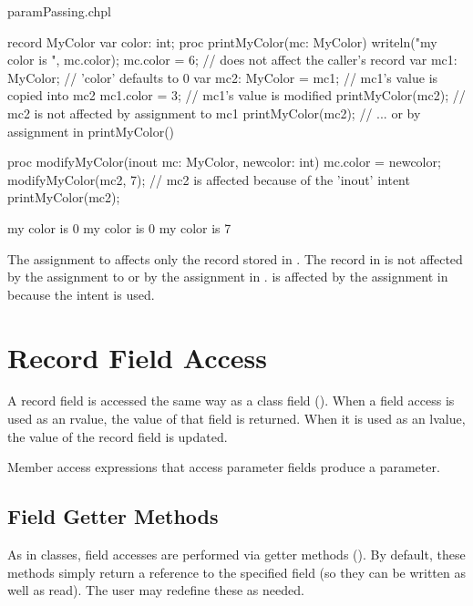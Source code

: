 \begin{chapelexample}{paramPassing.chpl}
\begin{chapel}
record MyColor {
  var color: int;
}
proc printMyColor(mc: MyColor) {
  writeln("my color is ", mc.color);
  mc.color = 6;   // does not affect the caller's record
}
var mc1: MyColor;        // 'color' defaults to 0
var mc2: MyColor = mc1;  // mc1's value is copied into mc2
mc1.color = 3;           // mc1's value is modified
printMyColor(mc2);       // mc2 is not affected by assignment to mc1
printMyColor(mc2);       // ... or by assignment in printMyColor()

proc modifyMyColor(inout mc: MyColor, newcolor: int) {
  mc.color = newcolor;
}
modifyMyColor(mc2, 7);   // mc2 is affected because of the 'inout' intent
printMyColor(mc2);
\end{chapel}
\begin{chapeloutput}
my color is 0
my color is 0
my color is 7
\end{chapeloutput}
The assignment to  affects only the record stored
in . The record in  is not affected by
the assignment to  or by the assignment in .
 is affected by the assignment in 
because the intent  is used.
\end{chapelexample}

\section{Record Field Access}
\label{Record_Field_Access}

A record field is accessed the same way as a class field
().  When a field access is used as an
rvalue, the value of that field is returned.  When it is used as
an lvalue, the value of the record field is updated.

Member access expressions that access parameter fields
produce a parameter.

\subsection{Field Getter Methods}
\label{Field_Getter_Methods}

As in classes, field accesses are performed via getter methods
().  By default, these methods simply return a reference to
the specified field (so they can be written as well as read).  The user may
redefine these as needed.

